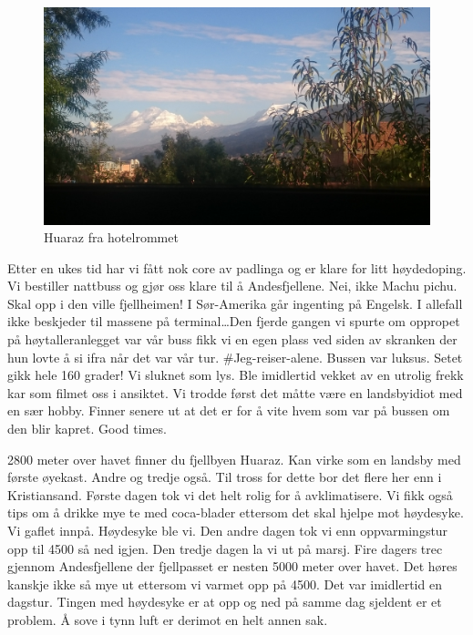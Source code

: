 \begin{figure}[!h]
	\centering
	\includegraphics[width=\textwidth]{Hotellromhuaraz}
	\caption*{Huaraz fra hotelrommet}	
\label{fig:huaraz}
\end{figure}
Etter en ukes tid har vi fått nok core av padlinga og er klare for
litt høydedoping. Vi bestiller nattbuss og gjør oss klare til å
Andesfjellene. Nei, ikke Machu pichu. Skal opp i den ville
fjellheimen! I Sør-Amerika går ingenting på Engelsk. I allefall ikke
beskjeder til massene på terminal\ldots Den fjerde
gangen vi spurte om oppropet på høytalleranlegget var vår buss fikk vi
en egen plass ved siden av skranken der hun lovte å si ifra når det var vår
tur. \#Jeg-reiser-alene. Bussen var luksus. Setet gikk hele 160 grader!
Vi sluknet som lys. Ble imidlertid vekket av en utrolig frekk kar som
filmet oss i ansiktet. Vi trodde først det måtte være en landsbyidiot
med en sær hobby. Finner senere ut at det er for å vite hvem som var
på bussen om den blir kapret. Good times. 


2800 meter over havet finner du fjellbyen Huaraz. Kan virke som en
landsby med første øyekast. Andre og tredje også. Til tross for dette
bor det flere her enn i Kristiansand. Første dagen tok vi det helt
rolig for å avklimatisere. Vi  fikk også tips om å drikke mye te med coca-blader
ettersom det skal hjelpe mot høydesyke. Vi gaflet innpå. Høydesyke ble
vi. Den andre dagen tok vi enn oppvarmingstur opp til 4500 så ned
igjen. Den tredje dagen la vi ut på marsj. Fire dagers trec gjennom
Andesfjellene der fjellpasset er nesten 5000 meter over havet. Det
høres kanskje ikke så mye ut ettersom vi varmet opp på 4500. Det var
imidlertid en dagstur. Tingen med høydesyke er at opp og ned på samme
dag sjeldent er et problem. Å sove i tynn luft er derimot
en helt annen sak.\\

